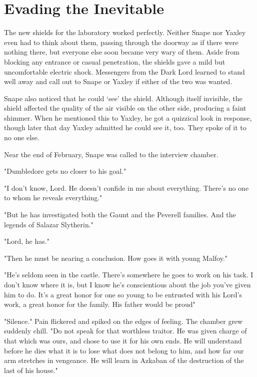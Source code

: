 
\chapter{Evading the Inevitable}

The new shields for the laboratory worked perfectly. Neither Snape nor Yaxley even had to think about them, passing through the doorway as if there were nothing there, but everyone else soon became very wary of them. Aside from blocking any entrance or casual penetration, the shields gave a mild but uncomfortable electric shock. Messengers from the Dark Lord learned to stand well away and call out to Snape or Yaxley if either of the two was wanted.

Snape also noticed that he could `see' the shield. Although itself invisible, the shield affected the quality of the air visible on the other side, producing a faint shimmer. When he mentioned this to Yaxley, he got a quizzical look in response, though later that day Yaxley admitted he could see it, too. They spoke of it to no one else.

Near the end of February, Snape was called to the interview chamber.

"Dumbledore gets no closer to his goal."

"I don't know, Lord. He doesn't confide in me about everything. There's no one to whom he reveals everything."

"But he has investigated both the Gaunt and the Peverell families. And the legends of Salazar Slytherin."

"Lord, he has."

"Then he must be nearing a conclusion. How goes it with young Malfoy."

"He's seldom seen in the castle. There's somewhere he goes to work on his task. I don't know where it is, but I know he's conscientious about the job you've given him to do. It's a great honor for one so young to be entrusted with his Lord's work, a great honor for the family. His father would be proud{\el}"

"Silence." Pain flickered and spiked on the edges of feeling. The chamber grew suddenly chill. "Do not speak for that worthless traitor. He was given charge of that which was ours, and chose to use it for his own ends. He will understand before he dies what it is to lose what does not belong to him, and how far our arm stretches in vengeance. He will learn in Azkaban of the destruction of the last of his house."

